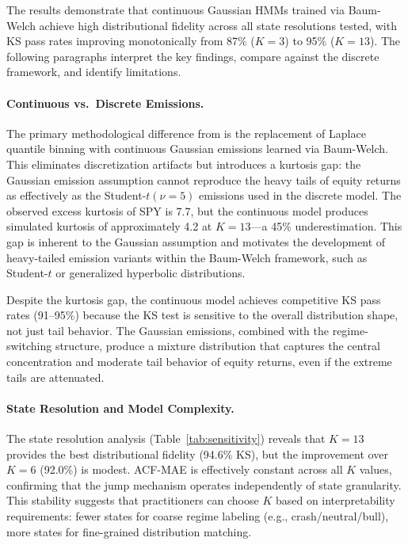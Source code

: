The results demonstrate that continuous Gaussian HMMs trained via Baum-Welch achieve high distributional fidelity across all state resolutions tested, with KS pass rates improving monotonically from 87\% ($K = 3$) to 95\% ($K = 13$).
The following paragraphs interpret the key findings, compare against the discrete framework, and identify limitations.

\paragraph{Continuous vs.\ Discrete Emissions.}
The primary methodological difference from \citet{alswaidan2026hybrid} is the replacement of Laplace quantile binning with continuous Gaussian emissions learned via Baum-Welch.
This eliminates discretization artifacts but introduces a kurtosis gap: the Gaussian emission assumption cannot reproduce the heavy tails of equity returns as effectively as the Student-$t(\nu = 5)$ emissions used in the discrete model.
The observed excess kurtosis of SPY is 7.7, but the continuous model produces simulated kurtosis of approximately 4.2 at $K = 13$---a 45\% underestimation.
This gap is inherent to the Gaussian assumption and motivates the development of heavy-tailed emission variants within the Baum-Welch framework, such as Student-$t$ or generalized hyperbolic distributions.

Despite the kurtosis gap, the continuous model achieves competitive KS pass rates (91--95\%) because the KS test is sensitive to the overall distribution shape, not just tail behavior.
The Gaussian emissions, combined with the regime-switching structure, produce a mixture distribution that captures the central concentration and moderate tail behavior of equity returns, even if the extreme tails are attenuated.

\paragraph{State Resolution and Model Complexity.}
The state resolution analysis (Table~\ref{tab:sensitivity}) reveals that $K = 13$ provides the best distributional fidelity (94.6\% KS), but the improvement over $K = 6$ (92.0\%) is modest.
ACF-MAE is effectively constant across all $K$ values, confirming that the jump mechanism operates independently of state granularity.
This stability suggests that practitioners can choose $K$ based on interpretability requirements: fewer states for coarse regime labeling (e.g., crash/neutral/bull), more states for fine-grained distribution matching.

